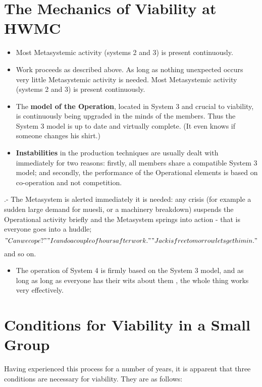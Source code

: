 \section*{The Mechanics of Viability at HWMC}
\begin{itemize}
  \item Most Metasystemic activity (systems 2 and 3) is present continuously.

  \item Work proceeds as described above. As long as nothing unexpected occurs very little Metasystemic activity is needed. Most Metasystemic activity (systems 2 and 3) is present continuously.

  \item The \textbf{model of the Operation}, located in System 3 and crucial to viability, is continuously being upgraded in the minds of the members. Thus the System 3 model is up to date and virtually complete. (It even knows if someone changes his shirt.)

  \item \textbf{Instabilities} in the production techniques are usually dealt with immediately for two reasons: firstly, all members share a compatible System 3 model; and secondly, the performance of the Operational elements is based on co-operation and not competition.

\end{itemize}

.-   The Metasystem is alerted immediately it is needed: any crisis (for example a sudden large demand for muesli, or a machinery breakdown) suspends the Operational activity briefly and the Metasystem springs into action - that is everyone goes into a huddle; \["Can we cope?" "I can do a couple of hours after work." "Jack is free tomorrow lets get him in."\] and so on.

\begin{itemize}
  \item The operation of System 4 is firmly based on the System 3 model, and as long as long as everyone has their wits about them , the whole thing works very effectively.
\end{itemize}

\section*{Conditions for Viability in a Small Group}
Having experienced this process for a number of years, it is apparent that three conditions are necessary for viability. They are as follows:

